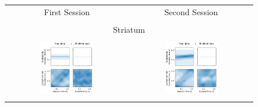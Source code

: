 \begin{figure}[ht]
    \centering
    \begin{tabular}{cc}
    {\Large \qquad First Session}& {\Large \qquad Second Session}    \\\\
    
    \multicolumn{2}{1}{{\large Striatum}}\\\\
    \includegraphics[width=0.45\textwidth]{figures/striatum_kde_bootstrap_vs_true_day1.png}    &  
    \includegraphics[width=0.45\textwidth]{figures/striatum_kde_bootstrap_vs_true_day2.png}    \\\\
    

\end{tabular}
\end{figure}
